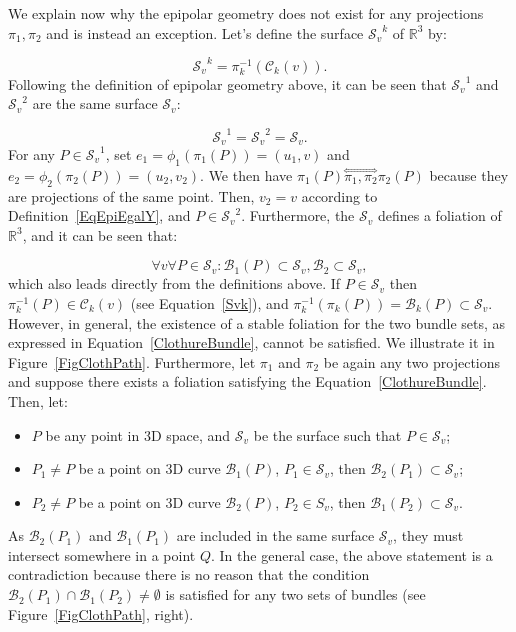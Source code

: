 \documentclass{ipol}
\newcommand{\RR}{\ensuremath{\mathbb{R}}}
\newcommand{\HComp}{\overset{\Longleftrightarrow}{\scriptscriptstyle \pi_1,\pi_2}}
\newcommand{\Bund}[1]{\ensuremath{\mathcal{B}_{#1}}}
\newcommand{\BundO}{\Bund{1}}
\newcommand{\BundT}{\Bund{2}}
\newcommand{\BundK}{\Bund{k}}
\newcommand{\CurveE}[1]{\ensuremath{\mathcal{C}_{#1}}}
\newcommand{\CurveK}{\CurveE{k}}
\newcommand{\Sv}{\ensuremath{\mathcal{S}_{v}}}
\begin{document}
%
%

We explain now why the epipolar geometry does not exist for any projections $\pi_1,\pi_2$ and is instead an exception. Let's define the surface $\Sv^k$ of $\RR^3$ by:

\begin{equation}
   \Sv^k = \pi_k^{-1}(\CurveK(v)).  \label{Svk}
\end{equation}
Following the definition of {epipolar geometry} above, it can be seen that $\Sv^1$ and $\Sv^2$ are the same surface $\Sv$:

\begin{equation}
   \Sv^1 = \Sv^2 = \Sv.
\end{equation}
For any $P\in\Sv^1$, set  $e_1=\phi_1(\pi_1(P))=(u_1,v)$
and $e_2=\phi_2(\pi_2(P))=(u_2,{v_2})$. We then have $\pi_1(P) \HComp \pi_2(P)$ because they are projections
of the same point. Then, $v_2=v$ according to Definition~\ref{EqEpiEgalY}, and $P \in \Sv^2$. Furthermore, the $\Sv$ defines a foliation of $\RR^3$, and it can be seen that:

\begin{equation}
   \forall v \forall P \in \Sv :  \BundO(P) \subset \Sv , \BundT \subset \Sv, \label{ClothureBundle}
\end{equation}
which also leads directly from the definitions above. If $P \in \Sv$ then $\pi_k^{-1}(P) \in \CurveK(v)$
(see Equation~\eqref{Svk}), and $\pi_k^{-1}(\pi_k(P)) = \BundK(P) \subset \Sv$.
%
However, in general, the existence of a stable foliation for the two bundle sets, as expressed in Equation~\eqref{ClothureBundle},
cannot  be satisfied. We illustrate it 
in Figure~\ref{FigClothPath}.  Furthermore, let $\pi_1$ and $\pi_2$ be again any two  projections and suppose
there exists  a foliation satisfying the Equation~\eqref{ClothureBundle}. Then, let: 

\begin{itemize}
   \item   $P$ be any point in $3$D space, and $\Sv$ be the surface such that $P \in \Sv$;
   \item   $P_1 \neq P$ be a point on 3D curve $\BundO(P)$, $P_1 \in \Sv$, then $\BundT(P_1) \subset \Sv$;
   \item   $P_2 \neq P$ be a point on 3D curve $\BundT(P)$, $P_2 \in S_v$, then $\BundO(P_2) \subset \Sv$.
\end{itemize}
As $\BundT(P_1)$ and $\BundO(P_1)$ are included in the same surface $\Sv$, they
            must intersect somewhere in a point $Q$.
In the general case, the above statement is a contradiction because  there is no reason that the condition $\BundT(P_1) \cap \BundO(P_2) \neq \emptyset $ is satisfied for any two sets
of bundles (see Figure~\ref{FigClothPath}, right).
\end{document}
